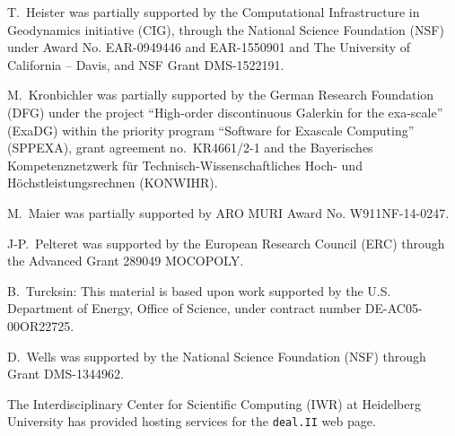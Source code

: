 \documentclass{ansarticle-preprint}
\newcommand{\specialword}[1]{\texttt{#1}}
\newcommand{\dealii}{{\specialword{deal.II}}}
\begin{document}
T.~Heister was partially supported by the Computational Infrastructure in
Geodynamics initiative (CIG), through the National Science Foundation (NSF)
under Award No. EAR-0949446 and EAR-1550901 and The University of
California -- Davis, and NSF Grant DMS-1522191.

M.~Kronbichler was partially supported by the German Research Foundation (DFG)
under the project ``High-order discontinuous Galerkin for the exa-scale''
(ExaDG) within the priority program ``Software for Exascale Computing''
(SPPEXA), grant agreement no.~KR4661/2-1 and the Bayerisches Kompetenznetzwerk
f\"ur Technisch-Wissenschaftliches Hoch- und H\"ochstleistungsrechnen
(KONWIHR).

M.~Maier was partially supported by ARO MURI Award No. W911NF-14-0247.

J-P.~Pelteret was supported by the European Research Council (ERC) through
the Advanced Grant 289049 MOCOPOLY.

B.~Turcksin: This material is based upon work supported by the U.S.
Department of Energy, Office of Science, under contract number
DE-AC05-00OR22725.

D.~Wells was supported by the National Science Foundation (NSF) through Grant
DMS-1344962.

The Interdisciplinary Center for Scientific Computing (IWR) at Heidelberg
University has provided hosting services for the \dealii{} web page.


{}

\end{document}
